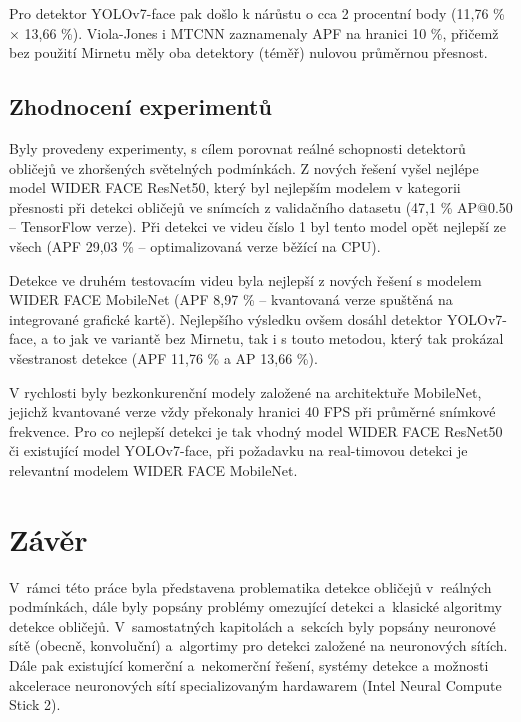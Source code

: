 Pro detektor YOLOv7-face pak došlo k nárůstu o cca 2 procentní body (11,76 \% $\times$ 13,66 \%). Viola-Jones i MTCNN zaznamenaly APF na hranici 10 \%, přičemž bez použití Mirnetu měly oba detektory (téměř) nulovou průměrnou přesnost.


\section{Zhodnocení experimentů}
\label{sekce:shnutiexperimentu}

Byly provedeny experimenty, s cílem porovnat reálné schopnosti detektorů obličejů ve zhoršených světelných podmínkách. Z nových řešení vyšel nejlépe model WIDER FACE ResNet50, který byl nejlepším modelem v kategorii přesnosti při detekci obličejů ve snímcích z validačního datasetu (47,1 \% AP@0.50 -- TensorFlow verze). Při detekci ve videu číslo 1 byl tento model opět nejlepší ze všech (APF 29,03 \% -- optimalizovaná verze běžící na CPU).

Detekce ve druhém testovacím videu byla nejlepší z nových řešení s modelem WIDER FACE MobileNet (APF 8,97 \% -- kvantovaná verze spuštěná na integrované grafické kartě). Nejlepšího výsledku ovšem dosáhl detektor YOLOv7-face, a to jak ve variantě bez Mirnetu, tak i s touto metodou, který tak prokázal všestranost detekce (APF 11,76 \% a AP 13,66 \%).

V rychlosti byly bezkonkurenční modely založené na architektuře MobileNet, jejichž kvantované verze vždy překonaly hranici 40 FPS při průměrné snímkové frekvence. Pro co nejlepší detekci je tak vhodný model WIDER FACE ResNet50 či existující model YOLOv7-face, při požadavku na real-timovou detekci je relevantní modelem WIDER FACE MobileNet.



\chapter{Závěr}
\label{kapitola:zaver}

V~rámci této práce byla představena problematika detekce obličejů v~reálných podmínkách, dále byly popsány problémy omezující detekci a~klasické algoritmy detekce obličejů. V~samostatných kapitolách a~sekcích byly popsány neuronové sítě (obecně, konvoluční) a~algortimy pro detekci založené na neuronových sítích. Dále pak existující komerční a~nekomerční řešení, systémy detekce a možnosti akcelerace neuronových sítí specializovaným hardawarem (Intel Neural Compute Stick 2).

